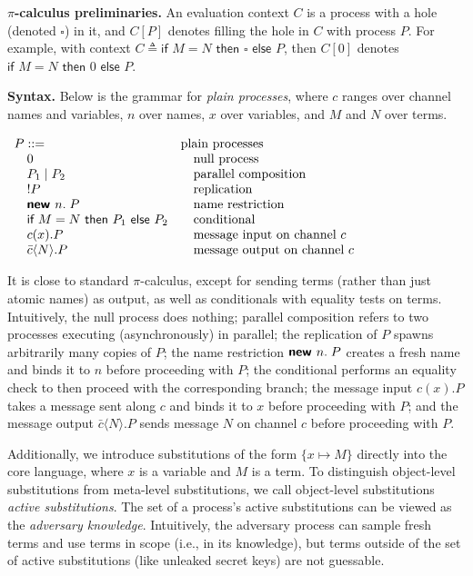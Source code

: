 \documentclass{article}
\theoremstyle{definition}
\begin{document}
\textbf{$\pi$-calculus preliminaries.} An evaluation context $C$ is a process with a hole (denoted $\square$) in it, and $C[P]$ denotes filling the hole in $C$ with process $P$. For example, with context $C \triangleq \textsf{if } M = N \textsf{ then } \square \textsf{ else } P$, then $C[0]$ denotes $\textsf{if } M = N \textsf{ then } 0 \textsf{ else } P$.

\textbf{Syntax.} Below is the grammar for \textit{plain processes}, where $c$ ranges over channel names and variables, $n$ over names, $x$ over variables, and $M$ and $N$ over terms.

$
\begin{array}{ll}
    P ::=  & \text{plain processes} \\ 
    \quad 0  & \quad\text{null process} \\ 
    \quad P_1 \mid P_2 & \quad\text{parallel composition} \\ 
    \quad !P & \quad\text{replication} \\ 
    \quad \textbf{\textsf{new }} n.\; P & \quad\text{name restriction} \\ 
    \quad \textsf{if } M=N \textsf{ then } P_1 \textsf{ else } P_2 & \quad\text{conditional} \\ 
    \quad c(x).P & \quad\text{message input on channel }c \\ 
    \quad \bar{c}\langle N \rangle.P & \quad\text{message output on channel }c
\end{array}
$

It is close to standard $\pi$-calculus, except for sending terms (rather than just atomic names) as output, 
as well as conditionals with equality tests on terms. 
Intuitively, the null process does nothing; 
parallel composition refers to two processes executing (asynchronously) in parallel;
the replication of $P$ spawns arbitrarily many copies of $P$;
the name restriction $\textbf{\textsf{new }} n.\;P$ creates a fresh name and binds it to $n$ before proceeding with $P$; 
the conditional performs an equality check to then proceed with the corresponding branch; 
the message input $c(x).P$ takes a message sent along $c$ and binds it to $x$ before proceeding with $P$; 
and the message output $\bar{c}\langle N \rangle.P$ sends message $N$ on channel $c$ before proceeding with $P$.

Additionally, we introduce substitutions of the form $\{ x \mapsto M \}$ directly into the core language, where $x$ is a variable and $M$ is a term. To distinguish object-level substitutions from meta-level substitutions, we call object-level substitutions \emph{active substitutions}. The set of a process's active substitutions can be viewed as the \textit{adversary knowledge}. Intuitively, the adversary process can sample fresh terms and use terms in scope (i.e., in its knowledge), but terms outside of the set of active substitutions (like unleaked secret keys) are not guessable.
\end{document}
